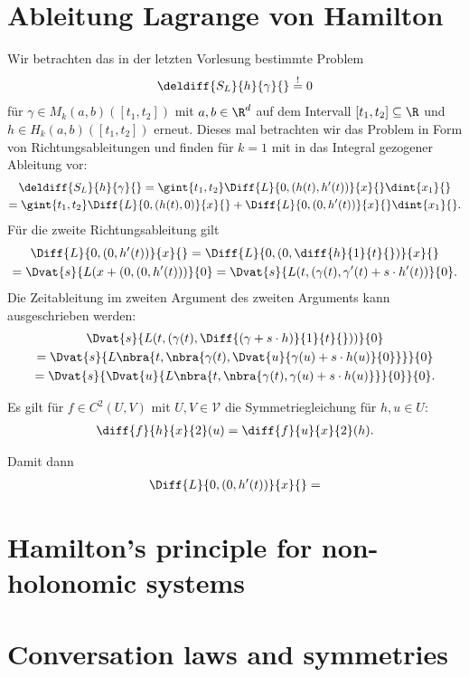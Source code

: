 \documentclass[../WiSe22ANA3.tex]{subfiles}
\begin{document}
	 	\section{Ableitung Lagrange von Hamilton}
			Wir betrachten das in der letzten Vorlesung bestimmte Problem 
			\begin{align*}
				\deldiff{S_L}{h}{\gamma}{}\stackrel{!}{=}0
			\end{align*}
			für $\gamma\in M_k(a,b)([t_1,t_2])$ mit $a,b\in\R^d$ auf dem Intervall $[t_1,t_2]\subseteq\R$ und $h\in H_k(a,b)([t_1,t_2])$ erneut. Dieses mal betrachten wir das Problem in Form von Richtungsableitungen und finden für $k=1$  mit in das Integral gezogener Ableitung vor:
			\begin{multline*}
				\deldiff{S_L}{h}{\gamma}{}=\gint{t_1,t_2}\Diff{L}{0,(h(t),h'(t))}{x}{}\dint{x_1}{}\\
				=\gint{t_1,t_2}\Diff{L}{0,(h(t),0)}{x}{}+\Diff{L}{0,(0,h'(t))}{x}{}\dint{x_1}{}. 
			\end{multline*}
			Für die zweite Richtungsableitung gilt
			\begin{multline*}
				\Diff{L}{0,(0,h'(t))}{x}{}=\Diff{L}{0,(0,\diff{h}{1}{t}{})}{x}{}\\
				=\Dvat{s}{L(x+(0,(0,h'(t)))}{0}=\Dvat{s}{L(t,(\gamma(t),\gamma'(t)+s\cdot h'(t))}{0}. 
			\end{multline*}
			Die Zeitableitung im zweiten Argument des zweiten Arguments kann ausgeschrieben werden:
			\begin{multline*}
				\Dvat{s}{L(t,(\gamma(t),\Diff{(\gamma+s\cdot h)}{1}{t}{}))}{0}\\
				=\Dvat{s}{L\nbra{t,\nbra{\gamma(t),\Dvat{u}{\gamma(u)+s\cdot h(u)}{0}}}}{0} \\
				=\Dvat{s}{\Dvat{u}{L\nbra{t,\nbra{\gamma(t),\gamma(u)+s\cdot h(u)}}}{0}}{0}. 
			\end{multline*} 
			\begin{Erinnerung}
				Es gilt für $f\in C^2(U,V)$ mit $U,V\in\mathcal V$ die Symmetriegleichung für $h,u\in U$:
				\begin{align*}
					\diff{f}{h}{x}{2}(u)=\diff{f}{u}{x}{2}(h). 
				\end{align*}
			\end{Erinnerung}
			Damit dann 
			\begin{align*}
				\Diff{L}{0,(0,h'(t))}{x}{}=
			\end{align*}
		\section{Hamilton's principle for non-holonomic systems}
	 		
	 	\section{Conversation laws and symmetries}
\end{document}
